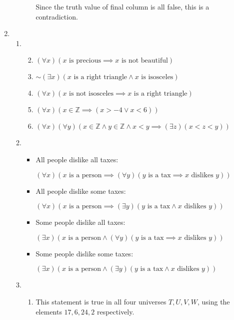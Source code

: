 \documentclass[12pt,letterpaper]{article}
\begin{document}
\begin{enumerate}
\begin{enumerate}
\begin{enumerate}
              Since the truth value of final column is all false,
              this is a contradiction.
          \end{enumerate}
      \end{enumerate}
    \item
      \begin{enumerate}
        \item
          \begin{enumerate}
            \setcounter{enumiii}{1}
            \item $(\forall x)(x \text{ is precious} \implies x \text{ is not beautiful})$
            \setcounter{enumiii}{3}
            \item $\sim (\exists x)(x \text{ is a right triangle} \land x \text{ is isosceles})$
            \item $(\forall x)(x \text{ is not isosceles} \implies x \text{ is a right triangle})$
            \setcounter{enumiii}{8}
            \item $(\forall x)(x \in \mathbb{Z} \implies (x > -4 \lor x < 6))$
            \setcounter{enumiii}{11}
            \item $(\forall x)(\forall y)(x \in \mathbb{Z} \land y \in \mathbb{Z} \land x < y \implies (\exists z)(x < z < y))$
          \end{enumerate}
        \setcounter{enumii}{4}
        \item
          \begin{itemize}
            \item
              All people dislike all taxes:

              $(\forall x)(x \text{ is a person} \implies (\forall y)(y \text{ is a tax} \implies x \text{ dislikes } y))$
            \item
              All people dislike some taxes:

              $(\forall x)(x \text{ is a person} \implies (\exists y)(y \text{ is a tax} \land x \text{ dislikes } y))$
            \item
              Some people dislike all taxes:

              $(\exists x)(x \text{ is a person} \land (\forall y)(y \text{ is a tax} \implies x \text{ dislikes } y))$
            \item
              Some people dislike some taxes:

              $(\exists x)(x \text{ is a person} \land (\exists y)(y \text{ is a tax} \land x \text{ dislikes } y))$
          \end{itemize}
        \item
          \begin{enumerate}
            \item
              This statement is true in all four universes $T, U, V, W$,
              using the elements $17, 6, 24, 2$ respectively.


\end{enumerate}
\end{enumerate}
\end{enumerate}
\end{document}
